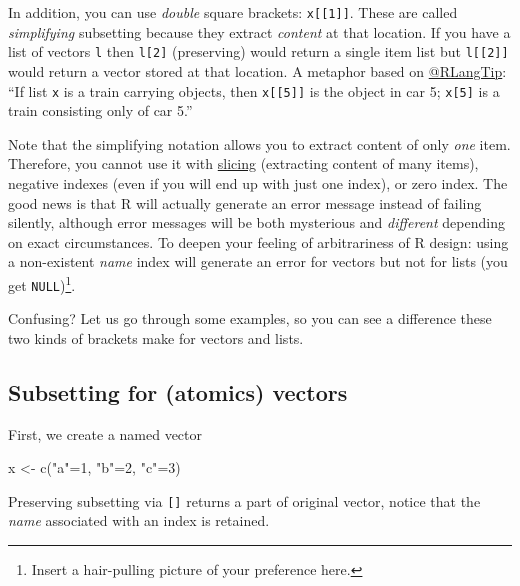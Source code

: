 \documentclass[
]{book}
\newenvironment{Shaded}{\begin{snugshade}}{\end{snugshade}}
\newcommand{\DecValTok}[1]{\textcolor[rgb]{0.00,0.00,0.81}{#1}}
\newcommand{\FunctionTok}[1]{\textcolor[rgb]{0.00,0.00,0.00}{#1}}
\newcommand{\NormalTok}[1]{#1}
\newcommand{\OtherTok}[1]{\textcolor[rgb]{0.56,0.35,0.01}{#1}}
\newcommand{\StringTok}[1]{\textcolor[rgb]{0.31,0.60,0.02}{#1}}
\begin{document}
In addition, you can use \emph{double} square brackets: \texttt{x{[}{[}1{]}{]}}. These are called \emph{simplifying} subsetting because they extract \emph{content} at that location. If you have a list of vectors \texttt{l} then \texttt{l{[}2{]}} (preserving) would return a single item list but \texttt{l{[}{[}2{]}{]}} would return a vector stored at that location. A metaphor based on \href{https://twitter.com/rlangtip}{@RLangTip}: ``If list \texttt{x} is a train carrying objects, then \texttt{x{[}{[}5{]}{]}} is the object in car 5; \texttt{x{[}5{]}} is a train consisting only of car 5.''

Note that the simplifying notation allows you to extract content of only \emph{one} item. Therefore, you cannot use it with \protect\hyperlink{vector-index-slicing}{slicing} (extracting content of many items), negative indexes (even if you will end up with just one index), or zero index. The good news is that R will actually generate an error message instead of failing silently, although error messages will be both mysterious and \emph{different} depending on exact circumstances. To deepen your feeling of arbitrariness of R design: using a non-existent \emph{name} index will generate an error for vectors but not for lists (you get \texttt{NULL})\footnote{Insert a hair-pulling picture of your preference here.}.

Confusing? Let us go through some examples, so you can see a difference these two kinds of brackets make for vectors and lists.

\hypertarget{subsetting-for-atomics-vectors}{%
\subsection{Subsetting for (atomics) vectors}\label{subsetting-for-atomics-vectors}}

First, we create a named vector

\begin{Shaded}
\begin{Highlighting}[]
\NormalTok{x }\OtherTok{\textless{}{-}} \FunctionTok{c}\NormalTok{(}\StringTok{"a"}\OtherTok{=}\DecValTok{1}\NormalTok{, }\StringTok{"b"}\OtherTok{=}\DecValTok{2}\NormalTok{, }\StringTok{"c"}\OtherTok{=}\DecValTok{3}\NormalTok{)}
\end{Highlighting}
\end{Shaded}

Preserving subsetting via \texttt{{[}{]}} returns a part of original vector, notice that the \emph{name} associated with an index is retained.
\end{document}
